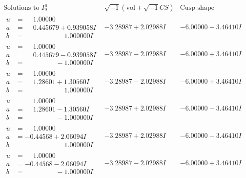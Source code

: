 \documentclass[1p]{elsarticle_modified}
\theoremstyle{definition}
\newcommand{\I}{\sqrt{-1}}
\begin{document}
$$\begin{array}{c|c|c}  
\text{Solutions to }I^u_{9}& \I (\text{vol} + \sqrt{-1}CS) & \text{Cusp shape}\\
 \hline 
\begin{aligned}
u &= \phantom{-}1.00000\phantom{ +0.000000I} \\
a &= \phantom{-}0.445679 + 0.939058 I \\
b &= \phantom{-0.000000 -}1.000000 I\end{aligned}
 & -3.28987 + 2.02988 I & -6.00000 - 3.46410 I \\ \hline\begin{aligned}
u &= \phantom{-}1.00000\phantom{ +0.000000I} \\
a &= \phantom{-}0.445679 - 0.939058 I \\
b &= \phantom{-0.000000 } -1.000000 I\end{aligned}
 & -3.28987 - 2.02988 I & -6.00000 + 3.46410 I \\ \hline\begin{aligned}
u &= \phantom{-}1.00000\phantom{ +0.000000I} \\
a &= \phantom{-}1.28601 + 1.30560 I \\
b &= \phantom{-0.000000 -}1.000000 I\end{aligned}
 & -3.28987 - 2.02988 I & -6.00000 + 3.46410 I \\ \hline\begin{aligned}
u &= \phantom{-}1.00000\phantom{ +0.000000I} \\
a &= \phantom{-}1.28601 - 1.30560 I \\
b &= \phantom{-0.000000 } -1.000000 I\end{aligned}
 & -3.28987 + 2.02988 I & -6.00000 - 3.46410 I \\ \hline\begin{aligned}
u &= \phantom{-}1.00000\phantom{ +0.000000I} \\
a &= -0.44568 + 2.06094 I \\
b &= \phantom{-0.000000 -}1.000000 I\end{aligned}
 & -3.28987 + 2.02988 I & -6.00000 - 3.46410 I \\ \hline\begin{aligned}
u &= \phantom{-}1.00000\phantom{ +0.000000I} \\
a &= -0.44568 - 2.06094 I \\
b &= \phantom{-0.000000 } -1.000000 I\end{aligned}
 & -3.28987 - 2.02988 I & -6.00000 + 3.46410 I \\ \hline\begin{aligned}

\end{aligned}
\end{array}$$
\end{document}
